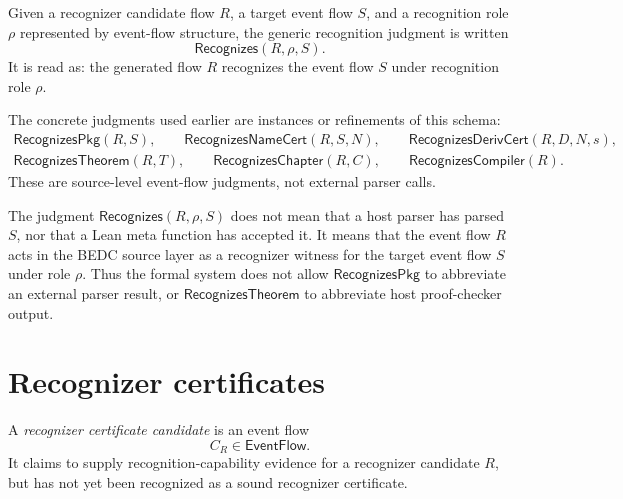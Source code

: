 \begin{definition}
\label{def:recognizer-generated-relation-schema}
Given a recognizer candidate flow $R$, a target event flow $S$, and a recognition role $\rho$ represented by event-flow structure, the generic recognition judgment is written
$$
  \mathsf{Recognizes}(R,\rho,S).
$$
It is read as: the generated flow $R$ recognizes the event flow $S$ under recognition role $\rho$.

The concrete judgments used earlier are instances or refinements of this schema:
$$
\begin{gathered}
  \mathsf{RecognizesPkg}(R,S),\qquad
  \mathsf{RecognizesNameCert}(R,S,N),\qquad
  \mathsf{RecognizesDerivCert}(R,D,N,s),\\
  \mathsf{RecognizesTheorem}(R,T),\qquad
  \mathsf{RecognizesChapter}(R,C),\qquad
  \mathsf{RecognizesCompiler}(R).
\end{gathered}
$$
These are source-level event-flow judgments, not external parser calls.
\end{definition}

\begin{remark}
\label{rem:recognizer-generated-not-host-parser}
The judgment $\mathsf{Recognizes}(R,\rho,S)$ does not mean that a host parser has parsed $S$, nor that a Lean meta function has accepted it. It means that the event flow $R$ acts in the BEDC source layer as a recognizer witness for the target event flow $S$ under role $\rho$. Thus the formal system does not allow $\mathsf{RecognizesPkg}$ to abbreviate an external parser result, or $\mathsf{RecognizesTheorem}$ to abbreviate host proof-checker output.
\end{remark}

\section{Recognizer certificates}
\label{sec:recognizer-generated-certificates}

\begin{definition}
\label{def:recognizer-generated-cert-candidate}
A \emph{recognizer certificate candidate} is an event flow
$$
  C_R\in\mathsf{EventFlow}.
$$
It claims to supply recognition-capability evidence for a recognizer candidate $R$, but has not yet been recognized as a sound recognizer certificate.
\end{definition}

